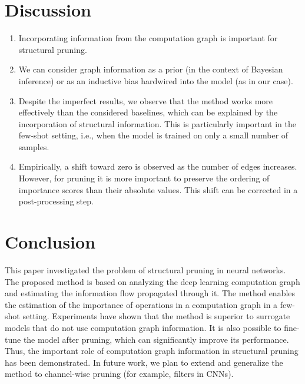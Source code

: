 \documentclass[runningheads]{llncs}
\begin{document}
\section{Discussion}
\begin{enumerate}
    \item Incorporating information from the computation graph is important for structural pruning.
    
    \item We can consider graph information as a prior (in the context of Bayesian inference) or as an inductive bias hardwired into the model (as in our case).
    
    \item Despite the imperfect results, we observe that the method works more effectively than the considered baselines, which can be explained by the incorporation of structural information. This is particularly important in the few-shot setting, i.e., when the model is trained on only a small number of samples.
    
    \item Empirically, a shift toward zero is observed as the number of edges increases. However, for pruning it is more important to preserve the ordering of importance scores than their absolute values. This shift can be corrected in a post-processing step.
\end{enumerate}

\section{Conclusion}

This paper investigated the problem of structural pruning in neural networks. 
The proposed method is based on analyzing the deep learning computation graph and estimating the information flow propagated through it. 
The method enables the estimation of the importance of operations in a computation graph in a few-shot setting. 
Experiments have shown that the method is superior to surrogate models that do not use computation graph information. It is also possible to fine-tune the model after pruning, which can significantly improve its performance. Thus, the important role of computation graph information in structural pruning has been demonstrated. In future work, we plan to extend and generalize the method to channel-wise pruning (for example, filters in CNNs).




%
%


\end{document}
